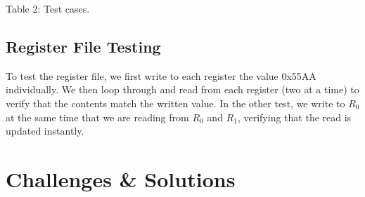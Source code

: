 \documentclass[11pt]{article}
\begin{document}
\vspace{12pt}
Table 2: Test cases.

\subsection{Register File Testing}
To test the register file, we first write to each register the value 0x55AA individually. We then loop through and read from each register (two at a time) to verify that the contents match the written value. In the other test, we write to $R_0$ at the same time that we are reading from $R_0$ and $R_1$, verifying that the read is updated instantly. 

\section{Challenges \& Solutions}
\end{document}
